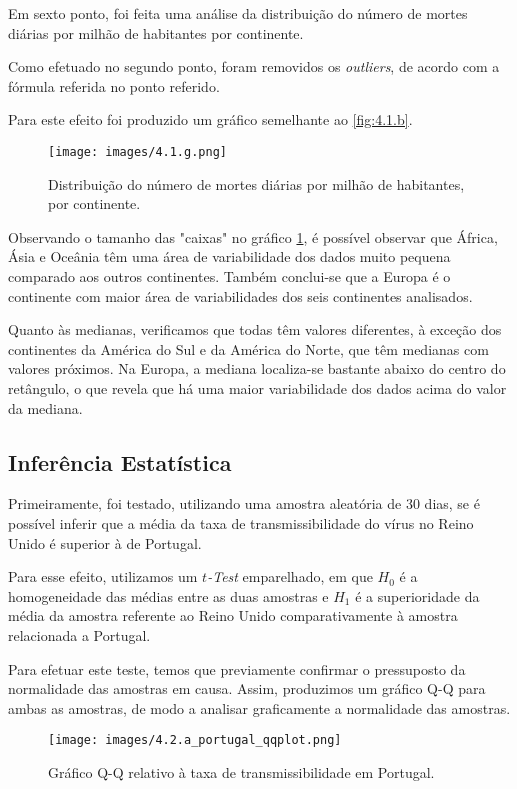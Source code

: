 \documentclass[conference]{IEEEtran}
\begin{document}
Em sexto ponto, foi feita uma análise da distribuição do número de mortes diárias por milhão de habitantes por continente.

Como efetuado no segundo ponto, foram removidos os \textit{outliers}, de acordo com a fórmula referida no ponto referido.

Para este efeito foi produzido um gráfico semelhante ao \ref{fig:4.1.b}.

\begin{figure}[h]
    \centering
    \texttt{[image: images/4.1.g.png]}
    \caption{Distribuição do número de mortes diárias por milhão de habitantes, por continente.}
    \label{fig:4.1.g}
\end{figure}

Observando o tamanho das "caixas" no gráfico \ref{fig:4.1.g}, é possível observar que África, Ásia e Oceânia têm uma área de variabilidade dos dados muito pequena comparado aos outros continentes. Também conclui-se que a Europa é o continente com maior área de variabilidades dos seis continentes analisados.

Quanto às medianas, verificamos que todas têm valores diferentes, à exceção dos continentes da América do Sul e da América do Norte, que têm medianas com valores próximos. Na Europa, a mediana localiza-se bastante abaixo do centro do retângulo, o que revela que há uma maior variabilidade dos dados acima do valor da mediana.

\subsection{Inferência Estatística}

Primeiramente, foi testado, utilizando uma amostra aleatória de 30 dias, se é possível inferir que a média da taxa de transmissibilidade do vírus no Reino Unido é superior à de Portugal.

Para esse efeito, utilizamos um \textit{$t$-Test} emparelhado, em que $H_{0}$ é a homogeneidade das médias entre as duas amostras e $H_{1}$ é a superioridade da média da amostra referente ao Reino Unido comparativamente à amostra relacionada a Portugal.

Para efetuar este teste, temos que previamente confirmar o pressuposto da normalidade das amostras em causa. Assim, produzimos um gráfico Q-Q para ambas as amostras, de modo a analisar graficamente a normalidade das amostras.

\begin{figure}[h]
    \centering
    \texttt{[image: images/4.2.a\_portugal\_qqplot.png]}
    \caption{Gráfico Q-Q relativo à taxa de transmissibilidade em Portugal.}
    \label{fig:4.2.por}
\end{figure}
\end{document}
